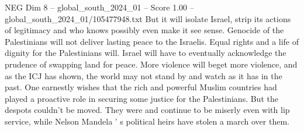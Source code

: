 \begin{textsample}{NEG Dim 8 – global\_south\_2024\_01 – Score 1.00 – global\_south\_2024\_01/105477948.txt}
But it will isolate Israel, strip its actions of legitimacy and who knows possibly even make it see sense.
Genocide of the Palestinians will not deliver lasting peace to the Israelis.
Equal rights and a life of dignity for the Palestinians will.
Israel will have to eventually acknowledge the prudence of swapping land for peace.
More violence will beget more violence, and as the ICJ has shown, the world may not stand by and watch as it has in the past.
One earnestly wishes that the rich and powerful Muslim countries had played a proactive role in securing some justice for the Palestinians.
But the despots couldn't be moved.
They were and continue to be miserly even with lip service, while Nelson Mandela ' s political heirs have stolen a march over them.

\end{textsample}
